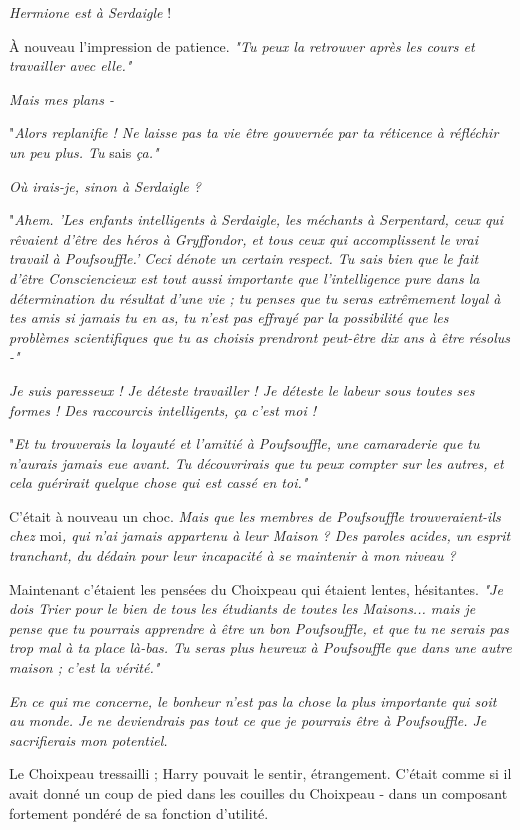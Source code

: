 \emph{Hermione est à Serdaigle}  !

À nouveau l'impression de patience. \emph{"Tu peux la retrouver après les cours et travailler avec elle."} 

\emph{Mais mes plans -} 

"\emph{Alors replanifie ! Ne laisse pas ta vie être gouvernée par ta réticence à réfléchir un peu plus. Tu } sais\emph{ ça."} 

\emph{Où irais-je, sinon à Serdaigle ?} 

"\emph{Ahem. 'Les enfants intelligents à Serdaigle, les méchants à Serpentard, ceux qui rêvaient d'être des héros à Gryffondor, et tous ceux qui accomplissent le vrai travail à Poufsouffle.' Ceci dénote un certain respect. Tu sais bien que le fait d'être Consciencieux est tout aussi importante que l'intelligence pure dans la détermination du résultat d'une vie ; tu penses que tu seras extrêmement loyal à tes amis si jamais tu en as, tu n'est pas effrayé par la possibilité que les problèmes scientifiques que tu as choisis prendront peut-être dix ans à être résolus -"} 

\emph{Je suis paresseux ! Je déteste travailler ! Je déteste le labeur sous toutes ses formes ! Des raccourcis intelligents, ça c'est moi !} 

"\emph{Et tu trouverais la loyauté et l'amitié à Poufsouffle, une camaraderie que tu n'aurais jamais eue avant. Tu découvrirais que tu peux compter sur les autres, et cela guérirait quelque chose qui est cassé en toi."} 

C'était à nouveau un choc. \emph{Mais que les membres de Poufsouffle trouveraient-ils chez } moi\emph{, qui n'ai jamais appartenu à leur Maison ? Des paroles acides, un esprit tranchant, du dédain pour leur incapacité à se maintenir à mon niveau ?} 

Maintenant c'étaient les pensées du Choixpeau qui étaient lentes, hésitantes. \emph{"Je dois Trier pour le bien de tous les étudiants de toutes les Maisons... mais je pense que tu pourrais apprendre à être un bon Poufsouffle, et que tu ne serais pas trop mal à ta place là-bas. Tu seras plus heureux à Poufsouffle que dans une autre maison ; c'est la vérité."} 

\emph{En ce qui me concerne, le bonheur n'est pas la chose la plus importante qui soit au monde. Je ne deviendrais pas tout ce que je pourrais être à Poufsouffle. Je sacrifierais mon potentiel.} 

Le Choixpeau tressailli ; Harry pouvait le sentir, étrangement. C'était comme si il avait donné un coup de pied dans les couilles du Choixpeau - dans un composant fortement pondéré de sa fonction d'utilité.

